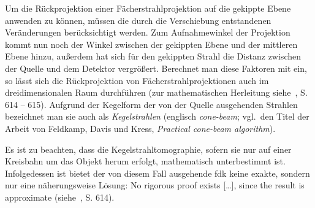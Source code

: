 Um die Rückprojektion einer Fächerstrahlprojektion auf die gekippte Ebene anwenden zu können, müssen die durch die
Verschiebung entstandenen Veränderungen berücksichtigt werden. Zum Aufnahmewinkel der Projektion kommt nun noch der
Winkel zwischen der gekippten Ebene und der mittleren Ebene hinzu, außerdem hat sich für den gekippten Strahl die
Distanz zwischen der Quelle und dem Detektor vergrößert. Berechnet man diese Faktoren mit ein, so lässt sich die
Rückprojektion von Fächerstrahlprojektionen auch im dreidimensionalen Raum durchführen (zur mathematischen Herleitung
siehe~\cite{fdk}, S. 614 -- 615). Aufgrund der Kegelform der von der Quelle ausgehenden Strahlen bezeichnet man sie auch
als \textit{Kegelstrahlen} (englisch \textit{cone-beam}; vgl.\ den Titel der Arbeit von Feldkamp, Davis und Kress,
\textit{Practical cone-beam algorithm}).

Es ist zu beachten, dass die Kegelstrahltomographie, sofern sie nur auf einer Kreisbahn um das Objekt herum erfolgt,
mathematisch unterbestimmt ist. Infolgedessen ist bietet der von diesem Fall ausgehende \gls{fdk} keine exakte, sondern
nur eine näherungsweise Lösung: {\glqq}No rigorous proof exists [\ldots], since the result is approximate{\grqq}
(siehe~\cite{fdk}, S. 614).

